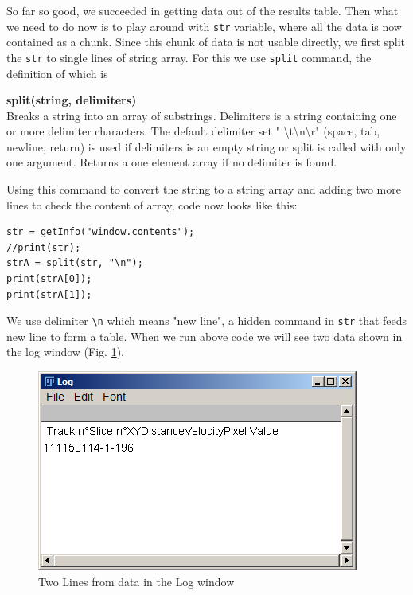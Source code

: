 \documentclass[11pt,a4paper,oneside]{report}
\newenvironment{indentCom}%
{\begin{list}{}%
         {\setlength{\leftmargin}{1em}}%
         \item[]%
}
{\end{list}}
\newcommand{\ilcom}[1]{\texttt{\small#1}}
\begin{document}
So far so good, we succeeded in getting data out of the results table. Then what we need to do now is to play around with \ilcom{str} variable, where all the data is now contained as a chunk.  Since this chunk of data is not usable directly, we first split the \ilcom{str} to single lines of string array. For this we use \ilcom{split} command, the definition of which is 

\begin{indentCom}
\textbf{split(string, delimiters)}\\
Breaks a string into an array of substrings. Delimiters is a string containing one or more delimiter characters. The default delimiter set " \textbackslash{}t\textbackslash{}n\textbackslash{}r" (space, tab, newline, return) is used if delimiters is an empty string or split is called with only one argument. Returns a one element array if no delimiter is found. 
\end{indentCom}

Using this command to convert the string to a string array and adding two more lines to check the content of array, code now looks like this:\\
\begin{lstlisting}[numbers=none, morekeywords={*, split}]
str = getInfo("window.contents");
//print(str);
strA = split(str, "\n");
print(strA[0]);
print(strA[1]);
\end{lstlisting}
We use delimiter \ilcom{\textbackslash{}n} which means "new line", a hidden command in \ilcom{str} that feeds new line to form a table. When we run above code we will see two data shown in the log window (Fig. \ref{fig:splittedLine}).
\begin{figure}[htbp]
\begin{center}
\includegraphics[scale=0.6]{fig/fig253_ZeroAndfirstlineValues.png}
\caption{Two Lines from data in the Log window}
\label{fig:splittedLine}
\end{center}
\end{figure}
\end{document}
